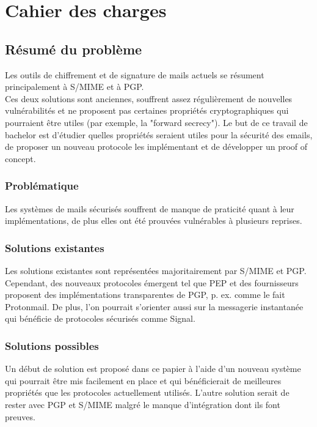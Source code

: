 \chapter{Cahier des charges}
\label{ch:cdc}
\section*{Résumé du problème}
Les outils de chiffrement et de signature de mails actuels se résument principalement à S/MIME et à PGP. \\
Ces deux solutions sont anciennes, souffrent assez régulièrement de nouvelles vulnérabilités et ne proposent pas certaines propriétés cryptographiques qui pourraient être utiles (par exemple, la "forward secrecy"). Le but de ce travail de bachelor est d'étudier quelles propriétés seraient utiles pour la sécurité des emails, de proposer un nouveau protocole les implémentant et de développer un proof of concept. 
\subsection*{Problématique}
Les systèmes de mails sécurisés souffrent de manque de praticité quant à leur implémentations, de plus elles ont été prouvées vulnérables à plusieurs reprises.
\subsection*{Solutions existantes}
Les solutions existantes sont représentées majoritairement par S/MIME et PGP. Cependant, des nouveaux protocoles émergent tel que PEP et des fournisseurs proposent des implémentations transparentes de PGP, p. ex. comme le fait Protonmail. De plus, l'on pourrait s'orienter aussi sur la messagerie instantanée qui bénéficie de protocoles sécurisés comme Signal.
\subsection*{Solutions possibles}
Un début de solution est proposé dans ce papier à l'aide d'un nouveau système qui pourrait être mis facilement en place et qui bénéficierait de meilleures propriétés que les protocoles actuellement utilisés. L'autre solution serait de rester avec PGP et S/MIME malgré le manque d'intégration dont ils font preuves.
